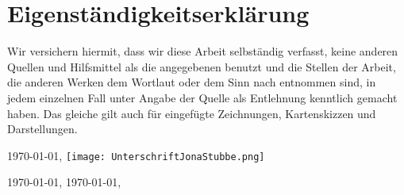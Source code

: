 \documentclass[a4paper,12pt,titlepage]{article}
\begin{document}
\part{Eigenständigkeitserklärung}
Wir versichern hiermit, dass wir diese Arbeit selbständig verfasst, keine anderen Quellen und Hilfsmittel
als die angegebenen benutzt und die Stellen der Arbeit, die anderen Werken dem Wortlaut oder dem Sinn nach entnommen sind,
in jedem einzelnen Fall unter Angabe der Quelle als Entlehnung kenntlich gemacht haben.
Das gleiche gilt auch für eingefügte Zeichnungen, Kartenskizzen und Darstellungen.

\today, \texttt{[image: UnterschriftJonaStubbe.png]}

\today, 
\today,
\end{document}
